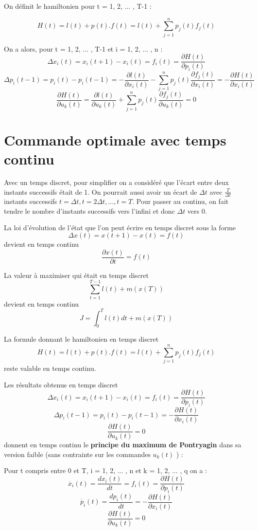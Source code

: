 \documentclass[10pt]{article}
\begin{document}
On définit le hamiltonien pour t = 1, 2, ... , T-1 :

\[ H(t) = l(t) + p(t) . f(t) = l(t) + \sum_{j=1}^n p_j(t) f_j(t) \] 

On a alors, pour t = 1, 2, ... , T-1 et i = 1, 2, ... , n : 
 \[ \Delta x_i(t) = x_i(t+1) - x_i(t) = f_i(t) = \frac{\partial H(t)}{\partial p_i(t)} \]
 \[ \Delta p_i(t-1) = p_i(t) - p_i(t-1) = - \frac{\partial l(t)}{\partial x_i(t)} - \sum_{j=1}^n p_j(t) \frac{\partial f_j(t)}{\partial x_i(t)} = - \frac{\partial H(t)}{\partial x_i(t)} \]
 \[ \frac{\partial H(t)}{\partial u_k(t)} = \frac{\partial l(t)}{\partial u_k(t)} + \sum_{j=1}^n p_j(t) \frac{\partial f_j(t)}{\partial u_k(t)} = 0 \]

\section{Commande optimale avec temps continu}

Avec un temps discret, pour simplifier on a considéré que l'écart entre deux instants successifs était de 1. On pourrait aussi avoir un écart de \( \Delta t \) avec \( \frac{T}{\Delta t} \) instants successifs \( t = \Delta t, t = 2 \Delta t, ... , t = T \). Pour passer au continu, on fait tendre le nombre d'instants successifs vers l'infini et donc \( \Delta t \) vers 0.

La loi d'évolution de l'état que l'on peut écrire en temps discret sous la forme 
\[ \Delta x(t) = x(t+1) - x(t) = f(t) \]
devient en temps continu 
\[ \frac{\partial x(t)}{\partial t} = f(t) \]

La valeur à maximiser qui était en temps discret
\[ \sum_{t=1}^{T-1}l(t) + m(x(T)) \]
devient en temps continu
\[ J = \int_0^T l(t) dt + m(x(T)) \]

La formule donnant le hamiltonien en temps discret 
\[ H(t) = l(t) + p(t) . f(t) = l(t) + \sum_{j=1}^n p_j(t) f_j(t) \]
reste valable en temps continu.

Les résultats obtenus en temps discret
\[ \Delta x_i(t) = x_i(t+1) - x_i(t) = f_i(t) = \frac{\partial H(t)}{\partial p_i(t)} \]
\[ \Delta p_i(t-1) = p_i(t) - p_i(t-1) = - \frac{\partial H(t)}{\partial x_i(t)} \]
\[ \frac{\partial H(t)}{\partial u_k(t)} = 0 \]
donnent en temps continu le \textbf{principe du maximum de Pontryagin} dans sa version faible (sans contrainte sur les commandes \( u_k(t) \) ) :

Pour t compris entre 0 et T, i = 1, 2, ... , n et k = 1, 2, ... , q on a :
\[ \dot{x_i}(t) = \frac{d x_i(t)}{d t} = f_i(t) = \frac{\partial H(t)}{\partial p_i(t)} \]
\[ \dot{p_i}(t) = \frac{d p_i(t)}{d t} = - \frac{\partial H(t)}{\partial x_i(t)} \]
\[ \frac{\partial H(t)}{\partial u_k(t)} = 0 \]
\end{document}
